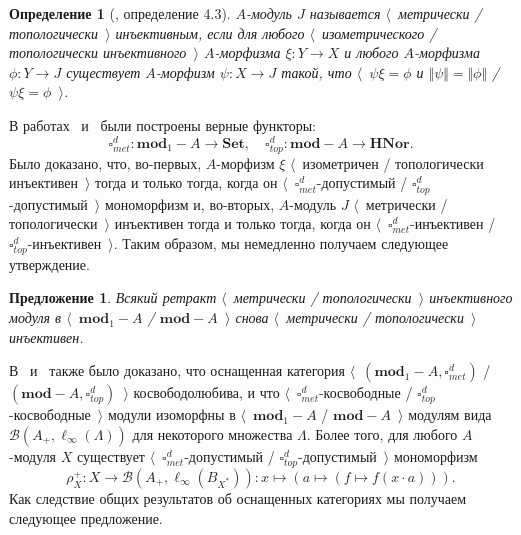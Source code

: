 \documentclass[12pt]{article}
\newtheorem{proposition}[theorem]{Предложение}
\newtheorem{definition}[theorem]{Определение}
\begin{document}
\begin{definition}[\cite{HelMetrFrQMod}, определение 4.3]\label{MetTopInjMod}
    $A$-модуль $J$ называется $\langle$~метрически / топологически~$\rangle$
    инъективным, если для любого $\langle$~изометрического / топологически
    инъективного~$\rangle$ $A$-морфизма $\xi:Y\to X$ и любого $A$-морфизма
    $\phi:Y\to J$ существует $A$-морфизм $\psi:X\to J$ такой, что
    $\langle$~$\psi\xi=\phi$ и $\Vert\psi\Vert=\Vert\phi\Vert$ /
    $\psi\xi=\phi$~$\rangle$.
\end{definition}

В работах~\cite{HelMetrFrQMod} и~\cite{ShtTopFrClassicQuantMod} были построены
верные функторы:
$$
    \square_{met}^d:\mathbf{mod}_1-A\to\mathbf{Set},
    \quad
    \square_{top}^d:\mathbf{mod}-A\to\mathbf{HNor}.
$$
Было доказано, что, во-первых, $A$-морфизм $\xi$ $\langle$~изометричен /
топологически инъективен~$\rangle$ тогда и только тогда, когда он
$\langle$~$\square_{met}^d$-допустимый / $\square_{top}^d$-допустимый~$\rangle$
мономорфизм и, во-вторых, $A$-модуль $J$ $\langle$~метрически /
топологически~$\rangle$ инъективен тогда и только тогда, когда он
$\langle$~$\square_{met}^d$-инъективен / $\square_{top}^d$-инъективен~$\rangle$.
Таким образом, мы немедленно получаем следующее утверждение.

\begin{proposition}\label{RetrMetTopInjIsMetTopInj} Всякий ретракт
    $\langle$~метрически / топологически~$\rangle$ инъективного модуля в
    $\langle$~$\mathbf{mod}_1-A$ / $\mathbf{mod}-A$~$\rangle$ снова
    $\langle$~метрически / топологически~$\rangle$ инъективен.
\end{proposition}

В~\cite{HelMetrFrQMod} и~\cite{ShtTopFrClassicQuantMod} также было доказано, что
оснащенная категория $\langle$~$(\mathbf{mod}_1-A,\square_{met}^d)$ /
$(\mathbf{mod}-A,\square_{top}^d)$~$\rangle$ косвободолюбива, и что
$\langle$~$\square_{met}^d$-косвободные /
$\square_{top}^d$-косвободные~$\rangle$ модули изоморфны в
$\langle$~$\mathbf{mod}_1-A$ / $\mathbf{mod}-A$~$\rangle$ модулям вида
$\mathcal{B}(A_+, \ell_\infty(\Lambda))$ для некоторого множества $\Lambda$.
Более того, для любого $A$-модуля $X$ существует
$\langle$~$\square_{met}^d$-допустимый / $\square_{top}^d$-допустимый~$\rangle$
мономорфизм
$$
    \rho_X^+:X\to\mathcal{B}(A_+,\ell_\infty(B_{X^*})):
    x\mapsto(a\mapsto(f\mapsto f(x\cdot a))).
$$
Как следствие общих результатов об оснащенных категориях мы получаем следующее
предложение.
\end{document}

